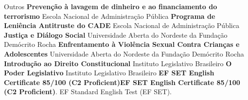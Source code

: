 \begin{rubric}{Outros}
	\entry*[2021] \textbf{Prevenção à lavagem de dinheiro e ao financiamento do terrorismo} Escola Nacional de Administração Pública
	\entry*[2021] \textbf{Programa de Leniência Antitruste do CADE} Escola Nacional de Administração Pública
	\entry*[2020] \textbf{Justiça e Diálogo Social} Universidade Aberta do Nordeste da Fundação Demócrito Rocha
	\entry*[2020] \textbf{Enfrentamento à Violência Sexual Contra Crianças e Adolescentes} Universidade Aberta do Nordeste da Fundação Demócrito Rocha
	\entry*[2019] \textbf{Introdução ao Direito Constitucional} Instituto Legislativo Brasileiro
	\entry*[2019] \textbf{O Poder Legislativo} Instituto Legislativo Brasileiro
\entry*[2021] \textbf{EF SET English Certificate 85/100 (C2 Proficient)EF SET English Certificate 85/100 (C2 Proficient)}. EF Standard English Test (EF SET).
\end{rubric}
